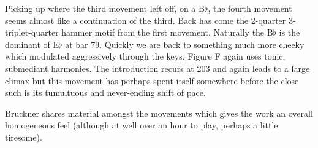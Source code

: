 Picking up where the third movement left off, on a B$\flat$, the fourth movement seems almost like a continuation of the third. Back has come the 2-quarter 3-triplet-quarter hammer motif from the first movement. Naturally the B$\flat$ is the dominant of E$\flat$ at bar 79. Quickly we are back to something much more cheeky which modulated aggressively through the keys. Figure F again uses tonic, submediant harmonies.  The introduction recurs at 203 and again leads to a large climax but this movement has perhaps spent itself somewhere before the close such is its tumultuous and never-ending shift of pace. 

Bruckner shares material amongst the movements which gives the work an overall homogeneous feel (although at well over an hour to play, perhaps a little tiresome). 


